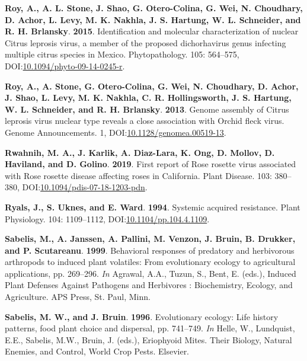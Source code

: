 \documentclass[12pt,final,CPage]{ufthesis}
\newlength{\cslhangindent}
\newenvironment{CSLReferences}[2] %
{%
	\setlength{\parindent}{0pt}
	\ifodd #1 \everypar{\setlength{\hangindent}{\cslhangindent}}\ignorespaces\fi
	\ifnum #2 > 0
	\setlength{\parskip}{#2\baselineskip}
	\fi
}%
{}
\begin{document}
{\begin{CSLReferences}{1}{0}
  \leavevmode{}%
  \textbf{Roy, A., A. L. Stone, J. Shao, G. Otero-Colina, G. Wei, N. Choudhary, D. Achor, L. Levy, M. K. Nakhla, J. S. Hartung, W. L. Schneider, and R. H. Brlansky}. \textbf{2015}. Identification and molecular characterization of nuclear {Citrus leprosis virus}, a member of the proposed dichorhavirus genus infecting multiple citrus species in {Mexico}. Phytopathology{\textregistered}. 105: 564--575, DOI:\href{https://doi.org/10.1094/phyto-09-14-0245-r}{10.1094/phyto-09-14-0245-r}.

  \leavevmode{}%
  \textbf{Roy, A., A. Stone, G. Otero-Colina, G. Wei, N. Choudhary, D. Achor, J. Shao, L. Levy, M. K. Nakhla, C. R. Hollingsworth, J. S. Hartung, W. L. Schneider, and R. H. Brlansky}. \textbf{2013}. Genome assembly of {Citrus leprosis virus} nuclear type reveals a close association with {Orchid fleck virus}. Genome Announcements. 1, DOI:\href{https://doi.org/10.1128/genomea.00519-13}{10.1128/genomea.00519-13}.

  \leavevmode{}%
  \textbf{Rwahnih, M. A., J. Karlik, A. Diaz-Lara, K. Ong, D. Mollov, D. Haviland, and D. Golino}. \textbf{2019}. First report of {Rose rosette virus} associated with {Rose rosette disease} affecting roses in {California}. Plant Disease. 103: 380--380, DOI:\href{https://doi.org/10.1094/pdis-07-18-1203-pdn}{10.1094/pdis-07-18-1203-pdn}.

  \leavevmode{}%
  \textbf{Ryals, J., S. Uknes, and E. Ward}. \textbf{1994}. Systemic acquired resistance. Plant Physiology. 104: 1109--1112, DOI:\href{https://doi.org/10.1104/pp.104.4.1109}{10.1104/pp.104.4.1109}.

  \leavevmode{}%
  \textbf{Sabelis, M., A. Janssen, A. Pallini, M. Venzon, J. Bruin, B. Drukker, and P. Scutareanu}. \textbf{1999}. Behavioral responses of predatory and herbivorous arthropods to induced plant volatiles: From evolutionary ecology to agricultural applications, pp. 269--296. \emph{In} Agrawal, A.A., Tuzun, S., Bent, E. (eds.), Induced Plant Defenses Against Pathogens and Herbivores : Biochemistry, Ecology, and Agriculture. APS Press, St. Paul, Minn.

  \leavevmode{}%
  \textbf{Sabelis, M. W., and J. Bruin}. \textbf{1996}. Evolutionary ecology: Life history patterns, food plant choice and dispersal, pp. 741--749. \emph{In} Helle, W., Lundquist, E.E., Sabelis, M.W., Bruin, J. (eds.), Eriophyoid Mites. Their Biology, Natural Enemies, and Control, World Crop Pests. Elsevier.


\end{CSLReferences}}
\end{document}
